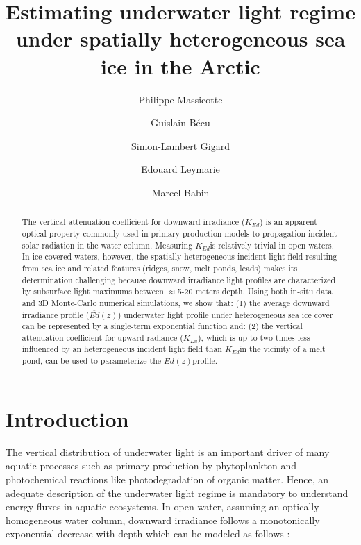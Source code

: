 \documentclass[10pt,a4paper,leqno]{article}
\title{Estimating underwater light regime under spatially heterogeneous sea ice in the Arctic}
\author[1]{Philippe Massicotte}
\author[1]{Guislain Bécu}
\author[1]{Simon-Lambert Gigard}
\author[2]{Edouard Leymarie}
\author[1]{Marcel Babin}
\affil[1]{Takuvik Joint International Laboratory (UMI 3376) \protect\\ Université Laval (Canada) \& Centre National de la Recherche Scientifique (France)}
\affil[2]{Laboratoire d'Océanographie de Villefranche - LOV (UMR-CNRS 7093)}
\date{}
\newcommand{\ked}{\ensuremath{K_{Ed}}}
\newcommand{\klu}{\ensuremath{K_{Lu}}}
\newcommand{\edz}{\ensuremath{{Ed(z)}}}
\newcommand{\meanedz}{\ensuremath{{\overline{Ed}(z)}}}
\begin{document}
\maketitle

\begin{abstract}
	The vertical attenuation coefficient for downward irradiance (\ked) is an apparent optical property commonly used in primary production models to propagation incident solar radiation in the water column. Measuring \ked is relatively trivial in open waters. In ice-covered waters, however, the spatially heterogeneous incident light field resulting from sea ice and related features (ridges, snow, melt ponds, leads) makes its determination challenging because downward irradiance light profiles are characterized by subsurface light maximums between $\approx$5-20 meters depth.  Using both in-situ data and 3D Monte-Carlo numerical simulations, we show that: (1) the average downward irradiance profile (\meanedz) underwater light profile under heterogeneous sea ice cover can be represented by a single-term exponential function and: (2) the vertical attenuation coefficient for upward radiance (\klu), which is up to two times less influenced by an heterogeneous incident light field than \ked in the vicinity of a melt pond, can be used to parameterize the \edz profile.
\end{abstract}

\clearpage

\section*{Introduction}
\linenumbers

The vertical distribution of underwater light is an important driver of many aquatic processes such as primary production by phytoplankton and photochemical reactions like photodegradation of organic matter. Hence, an adequate description of the underwater light regime is mandatory to understand energy fluxes in aquatic ecosystems. In open water, assuming an optically homogeneous water column, downward irradiance follows a monotonically exponential decrease with depth which can be modeled as follows \citep{Kirk1994}:

\clearpage
\printbibliography
\end{document}
